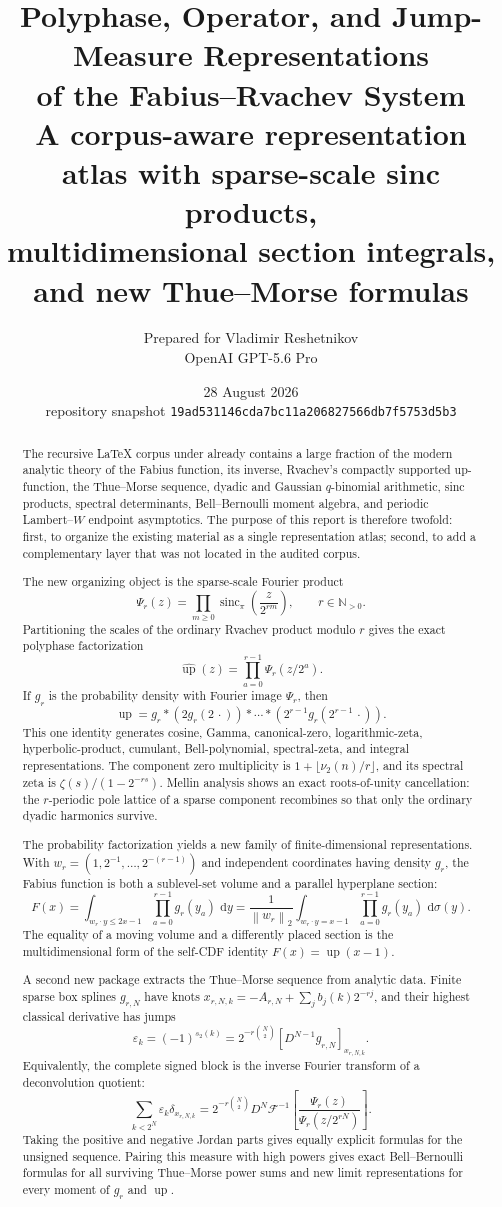 \documentclass[11pt,oneside]{article}
\title{\bfseries Polyphase, Operator, and Jump-Measure Representations\\[0.25em]
of the Fabius--Rvachev System\\[0.55em]
\large A corpus-aware representation atlas with sparse-scale sinc products,\\
multidimensional section integrals, and new Thue--Morse formulas}
\author{Prepared for Vladimir Reshetnikov\\
\small OpenAI GPT-5.6 Pro}
\date{28 August 2026\\
\small repository snapshot \nolinkurl{19ad531146cda7bc11a206827566db7f5753d5b3}}
\numberwithin{equation}{section}
\theoremstyle{definition}
\theoremstyle{remark}
\newcommand{\N}{\mathbb N}
\newcommand{\Up}{\operatorname{up}}
\newcommand{\sincpi}{\operatorname{sinc}_{\pi}}
\newcommand{\dd}{\,\mathrm d}
\newcommand{\eps}{\varepsilon}
\newcommand{\jump}[2]{\left[#1\right]_{#2}}
\newcommand{\norm}[1]{\left\lVert#1\right\rVert}
\newcommand{\cF}{\mathcal F}
\begin{document}
\maketitle

\begin{abstract}
The recursive LaTeX corpus under
 already contains a large fraction of the
modern analytic theory of the Fabius function, its inverse, Rvachev's compactly
supported up-function, the Thue--Morse sequence, dyadic and Gaussian
$q$-binomial arithmetic, sinc products, spectral determinants, Bell--Bernoulli
moment algebra, and periodic Lambert--$W$ endpoint asymptotics.  The purpose of
this report is therefore twofold: first, to organize the existing material as a
single representation atlas; second, to add a complementary layer that was not
located in the audited corpus.

The new organizing object is the sparse-scale Fourier product
\[
 \Psi_r(z)=\prod_{m\ge0}\sincpi\!\left(\frac{z}{2^{rm}}\right),
 \qquad r\in\N_{>0}.
\]
Partitioning the scales of the ordinary Rvachev product modulo $r$ gives the
exact polyphase factorization
\[
 \widehat{\Up}(z)=\prod_{a=0}^{r-1}\Psi_r(z/2^a).
\]
If $g_r$ is the probability density with Fourier image $\Psi_r$, then
\[
 \Up=g_r*(2g_r(2\,\cdot))*\cdots*(2^{r-1}g_r(2^{r-1}\,\cdot)).
\]
This one identity generates cosine, Gamma, canonical-zero, logarithmic-zeta,
hyperbolic-product, cumulant, Bell-polynomial, spectral-zeta, and integral
representations.  The component zero multiplicity is
$1+\lfloor\nu_2(n)/r\rfloor$, and its spectral zeta is
$\zeta(s)/(1-2^{-rs})$.  Mellin analysis shows an exact roots-of-unity
cancellation: the $r$-periodic pole lattice of a sparse component recombines so
that only the ordinary dyadic harmonics survive.

The probability factorization yields a new family of finite-dimensional
representations.  With
$w_r=(1,2^{-1},\ldots,2^{-(r-1)})$ and independent coordinates having density
$g_r$, the Fabius function is both a sublevel-set volume and a parallel
hyperplane section:
\[
 F(x)=\int_{w_r\cdot y\le2x-1}\prod_{a=0}^{r-1}g_r(y_a)\,\dd y
 =\frac1{\norm{w_r}_2}\int_{w_r\cdot y=x-1}
       \prod_{a=0}^{r-1}g_r(y_a)\,\dd\sigma(y).
\]
The equality of a moving volume and a differently placed section is the
multidimensional form of the self-CDF identity $F(x)=\Up(x-1)$.

A second new package extracts the Thue--Morse sequence from analytic data.
Finite sparse box splines $g_{r,N}$ have knots
$x_{r,N,k}=-A_{r,N}+\sum_j b_j(k)2^{-rj}$, and their highest classical
derivative has jumps
\[
 \eps_k=(-1)^{s_2(k)}
 =2^{-r\binom N2}\jump{D^{N-1}g_{r,N}}{x_{r,N,k}}.
\]
Equivalently, the complete signed block is the inverse Fourier transform of a
deconvolution quotient:
\[
 \sum_{k<2^N}\eps_k\delta_{x_{r,N,k}}
 =2^{-r\binom N2}D^N\cF^{-1}\!\left[
   \frac{\Psi_r(z)}{\Psi_r(z/2^{rN})}\right].
\]
Taking the positive and negative Jordan parts gives equally explicit formulas
for the unsigned sequence.  Pairing this measure with high powers gives exact
Bell--Bernoulli formulas for all surviving Thue--Morse power sums and new limit
representations for every moment of $g_r$ and $\Up$.


\end{abstract}
\end{document}
